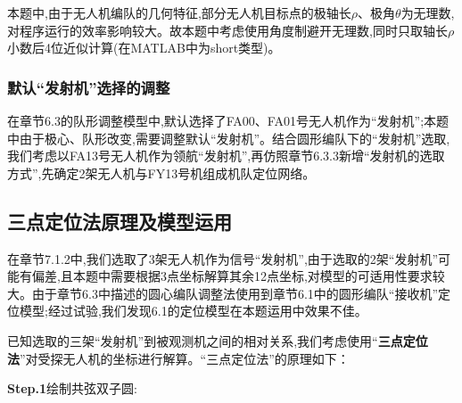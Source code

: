 \documentclass[withoutpreface,bwprint]{cumcmthesis} %
\begin{document}
							本题中,由于无人机编队的几何特征,部分无人机目标点的极轴长$\rho$、极角$\theta$为无理数,对程序运行的效率影响较大。故本题中考虑使用角度制避开无理数,同时只取轴长$\rho$小数后4位近似计算(在MATLAB中为short类型)。
						
				\subsubsection{默认“发射机”选择的调整}
				
					在章节6.3的队形调整模型中,默认选择了FA00、FA01号无人机作为“发射机”;本题中由于极心、队形改变,需要调整默认“发射机”。结合圆形编队下的“发射机”选取,我们考虑以FA13号无人机作为领航“发射机”,再仿照章节6.3.3新增“发射机的选取方式”,先确定2架无人机与FY13号机组成机队定位网络。
		
%				
		\subsection{三点定位法原理及模型运用}
		
			在章节7.1.2中,我们选取了3架无人机作为信号“发射机”,由于选取的2架“发射机”可能有偏差,且本题中需要根据3点坐标解算其余12点坐标,对模型的可适用性要求较大。由于章节6.3中描述的圆心编队调整法使用到章节6.1中的圆形编队“接收机”定位模型;经过试验,我们发现6.1的定位模型在本题运用中效果不佳。
			
			已知选取的三架“发射机”到被观测机之间的相对关系,我们考虑使用“\textbf{三点定位法}”对受探无人机的坐标进行解算。“三点定位法”的原理如下：
			
			
		\noindent	\textbf{Step.1}绘制共弦双子圆:
			
\end{document}
